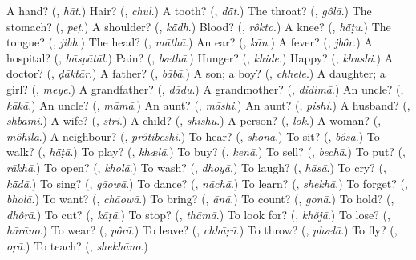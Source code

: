 \begin{tcolorbox}[breakable,colback=teal!4,colframe=teal!35!black,title={Before you move on}]
A hand? (\textbf{}, \emph{hāt}.) Hair? (\textbf{}, \emph{chul}.) A tooth? (\textbf{}, \emph{dā̃t}.) The throat? (\textbf{}, \emph{gôlā}.) The stomach? (\textbf{}, \emph{peṭ}.) A shoulder? (\textbf{}, \emph{kā̃dh}.) Blood? (\textbf{}, \emph{rôkto}.) A knee? (\textbf{}, \emph{hā̃ṭu}.) The tongue? (\textbf{}, \emph{jibh}.) The head? (\textbf{}, \emph{māthā}.) An ear? (\textbf{}, \emph{kān}.) A fever? (\textbf{}, \emph{jbôr}.) A hospital? (\textbf{}, \emph{hāspātāl}.) Pain? (\textbf{}, \emph{bæthā}.) Hunger? (\textbf{}, \emph{khide}.) Happy? (\textbf{}, \emph{khushi}.) A doctor? (\textbf{}, \emph{ḍāktār}.) A father? (\textbf{}, \emph{bābā}.) A son; a boy? (\textbf{}, \emph{chhele}.) A daughter; a girl? (\textbf{}, \emph{meye}.) A grandfather? (\textbf{}, \emph{dādu}.) A grandmother? (\textbf{}, \emph{didimā}.) An uncle? (\textbf{}, \emph{kākā}.) An uncle? (\textbf{}, \emph{māmā}.) An aunt? (\textbf{}, \emph{māshi}.) An aunt? (\textbf{}, \emph{pishi}.) A husband? (\textbf{}, \emph{shbāmi}.) A wife? (\textbf{}, \emph{stri}.) A child? (\textbf{}, \emph{shishu}.) A person? (\textbf{}, \emph{lok}.) A woman? (\textbf{}, \emph{môhilā}.) A neighbour? (\textbf{}, \emph{prôtibeshi}.) To hear? (\textbf{}, \emph{shonā}.) To sit? (\textbf{}, \emph{bôsā}.) To walk? (\textbf{}, \emph{hā̃ṭā}.) To play? (\textbf{}, \emph{khælā}.) To buy? (\textbf{}, \emph{kenā}.) To sell? (\textbf{}, \emph{bechā}.) To put? (\textbf{}, \emph{rākhā}.) To open? (\textbf{}, \emph{kholā}.) To wash? (\textbf{}, \emph{dhoyā}.) To laugh? (\textbf{}, \emph{hāsā}.) To cry? (\textbf{}, \emph{kā̃dā}.) To sing? (\textbf{}, \emph{gāowā}.) To dance? (\textbf{}, \emph{nāchā}.) To learn? (\textbf{}, \emph{shekhā}.) To forget? (\textbf{}, \emph{bholā}.) To want? (\textbf{}, \emph{chāowā}.) To bring? (\textbf{}, \emph{ānā}.) To count? (\textbf{}, \emph{gonā}.) To hold? (\textbf{}, \emph{dhôrā}.) To cut? (\textbf{}, \emph{kāṭā}.) To stop? (\textbf{}, \emph{thāmā}.) To look for? (\textbf{}, \emph{khõjā}.) To lose? (\textbf{}, \emph{hārāno}.) To wear? (\textbf{}, \emph{pôrā}.) To leave? (\textbf{}, \emph{chhāṛā}.) To throw? (\textbf{}, \emph{phælā}.) To fly? (\textbf{}, \emph{oṛā}.) To teach? (\textbf{}, \emph{shekhāno}.)
\end{tcolorbox}
